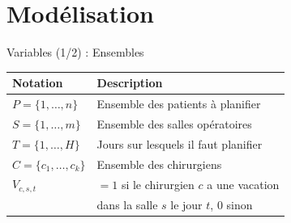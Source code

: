 \documentclass[aspectratio=169,11pt]{beamer}
\begin{document}
\section{Modélisation}


\begin{frame}{Variables (1/2) : Ensembles}
  \begin{table}
    \centering
    \begin{tabular}{ll}
      \toprule
      \textbf{Notation} & \textbf{Description} \\
      \midrule
      $P = \{1, \ldots, n\}$ & Ensemble des patients à planifier \\
      $S = \{1, \ldots, m\}$ & Ensemble des salles opératoires \\
      $T = \{1, \ldots, H\}$ & Jours sur lesquels il faut planifier \\
      $C = \{c_1, \ldots, c_k\}$ & Ensemble des chirurgiens \\
      $V_{c,s,t}$ & $= 1$ si le chirurgien $c$ a une vacation \\
                  & dans la salle $s$ le jour $t$, $0$ sinon \\
      \bottomrule
    \end{tabular}
  \end{table}
\end{frame}
\end{document}
